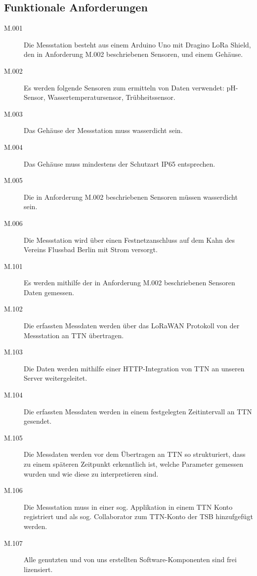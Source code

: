 \subsection{Funktionale Anforderungen}\label{subsec:func_require}

\begin{description}
	\item[M.001]
		Die Messstation besteht aus einem Arduino Uno mit Dragino LoRa Shield, den in
		Anforderung M.002 beschriebenen Sensoren, und einem Gehäuse.

	\item[M.002]
		Es werden folgende Sensoren zum ermitteln von Daten verwendet: pH-Sensor,
		Wassertemperatursensor, Trübheitssensor.

	\item[M.003]
		Das Gehäuse der Messstation muss wasserdicht sein.

	\item[M.004]
		Das Gehäuse muss mindestens der Schutzart IP65 entsprechen.

	\item[M.005]
		Die in Anforderung M.002 beschriebenen Sensoren müssen wasserdicht sein.

	\item[M.006]
		Die Messstation wird über einen Festnetzanschluss auf dem Kahn des Vereins
		\glqq Flussbad Berlin\grqq{} mit Strom versorgt.
\end{description}

\begin{description}
	\item[M.101]
		Es werden mithilfe der in Anforderung M.002 beschriebenen Sensoren Daten gemessen.

	\item[M.102]
		Die erfassten Messdaten werden über das LoRaWAN Protokoll von der Messstation
		an TTN übertragen.

	\item[M.103]
		Die Daten werden mithilfe einer HTTP-Integration von TTN an unseren Server
		weitergeleitet.

	\item[M.104]
		Die erfassten Messdaten werden in einem festgelegten Zeitintervall an TTN
		gesendet.

	\item[M.105]
		Die Messdaten werden vor dem Übertragen an TTN so strukturiert, dass zu einem
		späteren Zeitpunkt erkenntlich ist, welche Parameter gemessen wurden und wie
		diese zu interpretieren sind.

	\item[M.106]
		Die Messstation muss in einer sog. \glqq Applikation\grqq{} in einem TTN Konto
		registriert und als sog. \glqq Collaborator\grqq{} zum TTN-Konto der TSB
		hinzufgefügt werden.

	\item[M.107]
		Alle genutzten und von uns erstellten Software-Komponenten sind frei lizensiert.
\end{description}

